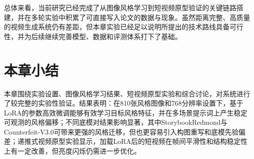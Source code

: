总体来看，当前研究已经完成了从图像风格学习到短视频原型验证的关键链路搭建，并在多轮实验中积累了可直接写入论文的数据与现象。虽然距离完整、高质量的视频生成系统仍有差距，但本章实验已经足以说明所提出的技术路线具备可行性，并为后续继续完善模型、数据和评测体系打下了基础。

\section{本章小结}

本章围绕实验设置、图像风格学习结果、短视频原型实验和综合讨论，对系统进行了较完整的实验性验证。结果表明：在810张风格图像和768分辨率设置下，基于LoRA的参数高效微调能够有效学习目标风格特征，并在多场景提示词上产生稳定可观测的风格偏移；不同底模对结果影响显著，其中StorybookRedmond与Counterfeit-V3.0可带来更强的风格迁移，但也更容易引入构图重写和底模先验偏差；递推式视频原型实验显示，加载LoRA后的短视频在帧间平滑性和结构稳定性上有一定改善，但亮度闪烁仍需进一步优化。
